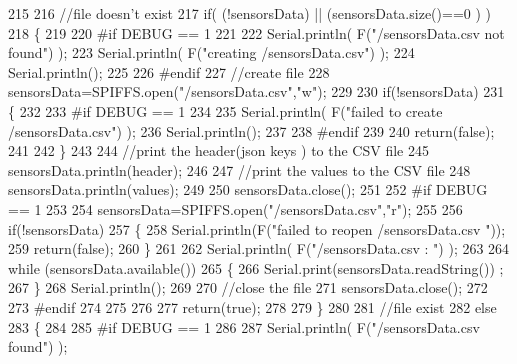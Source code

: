 \begin{DoxyCode}
215     
216     \textcolor{comment}{//file doesn't exist}
217     \textcolor{keywordflow}{if}( (!sensorsData) || (sensorsData.size()==0 ) )
218     \{
219     
220 \textcolor{preprocessor}{    #if DEBUG == 1}
221     
222         Serial.println( F(\textcolor{stringliteral}{"/sensorsData.csv not found"}) );
223         Serial.println( F(\textcolor{stringliteral}{"creating /sensorsData.csv"}) );
224         Serial.println();
225     
226 \textcolor{preprocessor}{    #endif}
227         \textcolor{comment}{//create file}
228         sensorsData=SPIFFS.open(\textcolor{stringliteral}{"/sensorsData.csv"},\textcolor{stringliteral}{"w"});
229         
230         \textcolor{keywordflow}{if}(!sensorsData)
231         \{
232 
233 \textcolor{preprocessor}{        #if DEBUG == 1}
234         
235             Serial.println( F(\textcolor{stringliteral}{"failed to create /sensorsData.csv"}) );
236             Serial.println();
237         
238 \textcolor{preprocessor}{        #endif}
239         
240             \textcolor{keywordflow}{return}(\textcolor{keyword}{false});
241 
242         \}
243         
244         \textcolor{comment}{//print the header(json keys ) to the CSV file}
245         sensorsData.println(header);
246 
247         \textcolor{comment}{//print the values to the CSV file}
248         sensorsData.println(values);
249         
250         sensorsData.close();
251     
252 \textcolor{preprocessor}{    #if DEBUG == 1}
253 
254         sensorsData=SPIFFS.open(\textcolor{stringliteral}{"/sensorsData.csv"},\textcolor{stringliteral}{"r"});
255         
256         \textcolor{keywordflow}{if}(!sensorsData)
257         \{
258             Serial.println(F(\textcolor{stringliteral}{"failed to reopen /sensorsData.csv "}));
259             \textcolor{keywordflow}{return}(\textcolor{keyword}{false});      
260         \}
261 
262         Serial.println( F(\textcolor{stringliteral}{"/sensorsData.csv : "}) );
263 
264         \textcolor{keywordflow}{while} (sensorsData.available()) 
265         \{
266             Serial.print(sensorsData.readString()) ;
267         \}
268         Serial.println();
269 
270         \textcolor{comment}{//close the file}
271         sensorsData.close();
272 
273 \textcolor{preprocessor}{    #endif}
274         
275 
276         
277         \textcolor{keywordflow}{return}(\textcolor{keyword}{true});
278         
279     \}
280 
281     \textcolor{comment}{//file exist}
282     \textcolor{keywordflow}{else}
283     \{
284 
285 \textcolor{preprocessor}{    #if DEBUG == 1}
286     
287         Serial.println( F(\textcolor{stringliteral}{"/sensorsData.csv  found"}) );

\end{DoxyCode}
